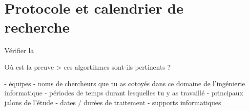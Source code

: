 \section{Protocole et calendrier de recherche}


    


    




Vérifier la 

Où est la preuve > ces algortihmes sont-ils pertinents ?


- équipes 
- noms de chercheurs que tu as cotoyés dans ce domaine de l'ingénierie informatique 
- périodes de temps durant lesquelles tu y as travaillé 
- principaux jalons de l'étude 
- dates / durées de  traitement
- supports informatiques 